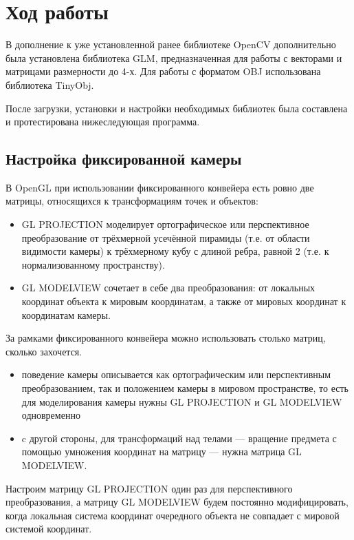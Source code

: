 \documentclass[14pt,a4paper,report]{report}
\begin{document}
\section{Ход работы}
В дополнение к уже установленной ранее библиотеке OpenCV дополнительно была установлена библиотека GLM, предназначенная для работы с векторами и матрицами размерности до 4-х. Для работы с форматом OBJ использована библиотека TinyObj.

После загрузки, установки и настройки необходимых библиотек была составлена и протестирована нижеследующая программа.

\subsection{Настройка фиксированной камеры}
В OpenGL при использовании фиксированного конвейера есть ровно две матрицы, относящихся к трансформациям точек и объектов:
\begin{itemize}

\item GL PROJECTION моделирует ортографическое или перспективное преобразование от трёхмерной усечённой пирамиды (т.е. от области видимости камеры) к трёхмерному кубу с длиной ребра, равной 2 (т.е. к нормализованному пространству).
\item GL MODELVIEW сочетает в себе два преобразования: от локальных координат объекта к мировым координатам, а также от мировых координат к координатам камеры.
\end{itemize}

За рамками фиксированного конвейера можно использовать столько матриц, сколько захочется. 

\begin{itemize}
\item поведение камеры описывается как ортографическим или перспективным преобразованием, так и положением камеры в мировом пространстве, то есть для моделирования камеры нужны GL PROJECTION и GL MODELVIEW одновременно
\item c другой стороны, для трансформаций над телами —  вращение предмета с помощью умножения координат на матрицу — нужна матрица GL MODELVIEW.
\end{itemize}

Настроим матрицу GL PROJECTION один раз для перспективного преобразования, а матрицу GL MODELVIEW будем постоянно модифицировать, когда локальная система координат очередного объекта не совпадает с мировой системой координат.
\end{document}
